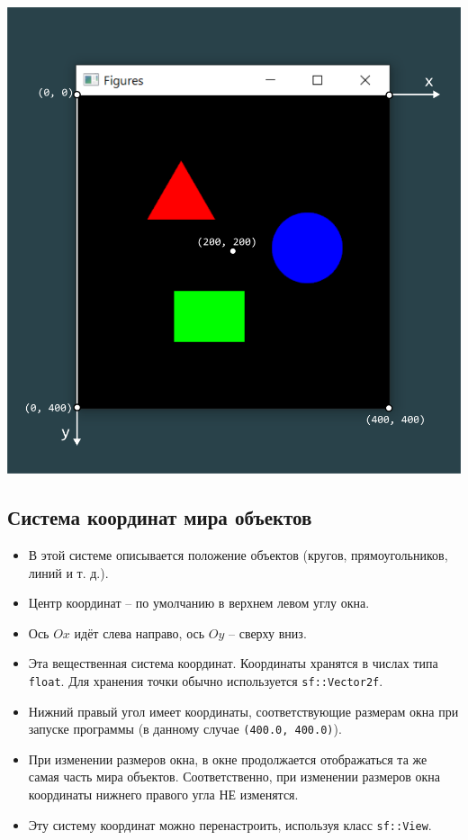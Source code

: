 \documentclass{article}
\begin{document}
\vspace{1cm}
\begin{center}
\includegraphics[scale=0.9]{../images/system_pixels.png}
\end{center}



\subsection*{Система координат мира объектов}
\begin{itemize}
\item В этой системе описывается положение объектов (кругов, прямоугольников, линий и т. д.).
\item Центр координат -- по умолчанию в верхнем левом углу окна. 
\item Ось $Ox$ идёт слева направо, ось $Oy$ -- сверху вниз.
\item Эта вещественная система координат. Координаты хранятся в числах типа \texttt{float}. Для хранения точки обычно используется \texttt{sf::Vector2f}.
\item Нижний правый угол имеет координаты, соответствующие размерам окна при запуске программы (в данному случае \texttt{(400.0, 400.0)}).
\item При изменении размеров окна, в окне продолжается отображаться та же самая часть мира объектов.
Соответственно, при изменении размеров окна координаты нижнего правого угла НЕ изменятся.
\item Эту систему координат можно перенастроить, используя класс \texttt{sf::View}.
\end{itemize}
\end{document}
